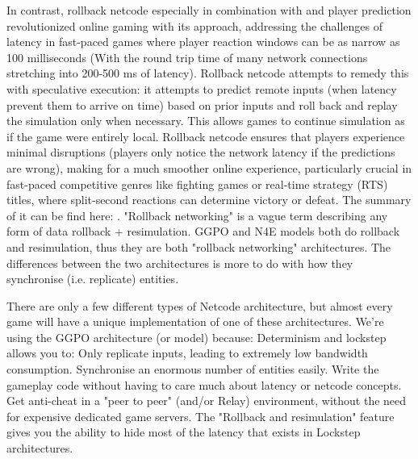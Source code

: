In contrast, rollback netcode especially in combination with and player prediction revolutionized online gaming with its approach, addressing the challenges of latency in fast-paced games where player reaction windows can be as narrow as 100 milliseconds (With the round trip time of many network connections stretching into 200-500 ms of latency). Rollback netcode attempts to remedy this with speculative execution: it attempts to predict remote inputs (when latency prevent them to arrive on time) based on prior inputs and roll back and replay the simulation only when necessary. This allows games to continue simulation as if the game were entirely local. Rollback netcode ensures that players experience minimal disruptions (players only notice the network latency if the predictions are wrong), making for a much smoother online experience, particularly crucial in fast-paced competitive genres like fighting games or real-time strategy (RTS) titles, where split-second reactions can determine victory or defeat. The summary of it can be find here: \cite{Rollback_overview}. "Rollback networking" is a vague term describing any form of data rollback + resimulation. GGPO and N4E models both do rollback and resimulation, thus they are both "rollback networking" architectures. The differences between the two architectures is more to do with how they synchronise (i.e. replicate) entities.

There are only a few different types of Netcode architecture, but almost every game will have a unique implementation of one of these architectures. We're using the GGPO architecture (or model) because: Determinism and lockstep allows you to:
Only replicate inputs, leading to extremely low bandwidth consumption.
Synchronise an enormous number of entities easily.
Write the gameplay code without having to care much about latency or netcode concepts.
Get anti-cheat in a "peer to peer" (and/or Relay) environment, without the need for expensive dedicated game servers.
The "Rollback and resimulation" feature gives you the ability to hide most of the latency that exists in Lockstep architectures.\newline

